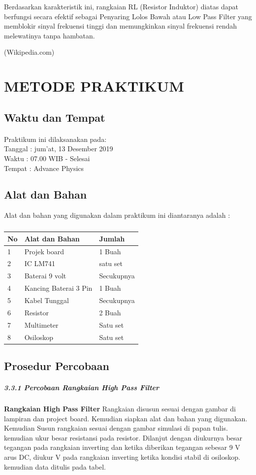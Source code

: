 \documentclass[12pt,a4paper]{article}
\begin{document}
Berdasarkan karakteristik ini, rangkaian RL (Resistor Induktor) diatas dapat berfungsi secara efektif sebagai Penyaring Lolos Bawah atau Low Pass Filter yang memblokir sinyal frekuensi tinggi dan memungkinkan sinyal frekuensi rendah melewatinya tanpa hambatan.
	
\begin{flushright}
(Wikipedia.com) 
\end{flushright}

\newpage
\section{METODE PRAKTIKUM}
\subsection{Waktu dan Tempat}
\paragraph{ }
Praktikum ini dilaksanakan pada:
\\ 		Tanggal : jum'at, 13 Desember 2019
\\ 		Waktu : 07.00 WIB - Selesai
\\ 		Tempat : Advance Physics 


\subsection{Alat dan Bahan}
Alat dan bahan yang digunakan dalam praktikum ini diantaranya adalah : 
\subparagraph*{ }
\begin{tabular}{|l|l|l|}  \hline
No & Alat dan Bahan  & Jumlah  \\ \hline
1  & Projek board & 1 Buah \\ \hline
2  & IC LM741 & satu set \\ \hline
3  & Baterai 9 volt & Secukupnya \\ \hline
4  & Kancing Baterai 3 Pin & 1 Buah \\ \hline
5  & Kabel Tunggal  & Secukupnya \\ \hline
6  & Resistor  & 2 Buah \\ \hline
7  & Multimeter & Satu set \\ \hline
8  & Osiloskop & Satu set \\ \hline
\end{tabular}

  
    
\subsection{Prosedur Percobaan}
\subparagraph{3.3.1 Percobaan Rangkaian High Pass Filter }
\subparagraph{ }
\textbf{Rangkaian High Pass Filter} Rangkaian disusun sesuai dengan gambar di lampiran dan project board. Kemudian siapkan alat dan bahan yang digunakan. Kemudian Susun rangkaian sesuai dengan gambar simulasi di papan tulis. kemudian ukur besar resistansi pada resistor. Dilanjut dengan diukurnya besar tegangan pada rangkaian inverting dan ketika diberikan tegangan sebesar 9 V arus DC, diukur  V pada rangkaian inverting ketika kondisi stabil di osiloskop. kemudian data ditulis pada tabel.
	
\end{document}
